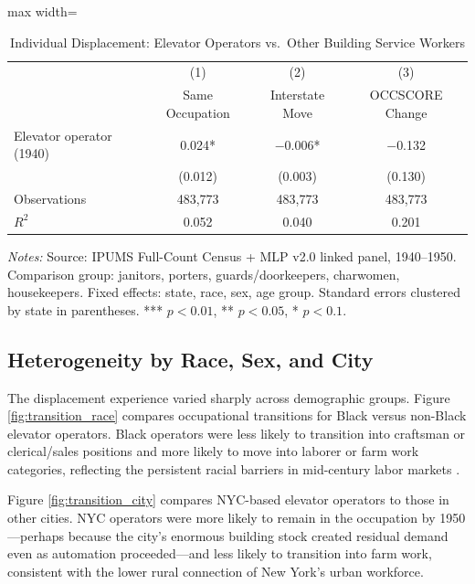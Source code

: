 \documentclass[12pt]{article}
\begin{document}
\begin{table}[H]
\centering
\caption{Individual Displacement: Elevator Operators vs.\ Other Building Service Workers}
\label{tab:displacement}
\begin{threeparttable}
\begin{adjustbox}{max width=\textwidth}
\begin{tabular}{lccc}
\toprule
& (1) & (2) & (3) \\
& Same Occupation & Interstate Move & OCCSCORE Change \\
\midrule
Elevator operator (1940) & 0.024* & $-$0.006* & $-$0.132 \\
& (0.012) & (0.003) & (0.130) \\
\midrule
Observations & 483,773 & 483,773 & 483,773 \\
$R^2$ & 0.052 & 0.040 & 0.201 \\
\bottomrule
\end{tabular}
\end{adjustbox}
\begin{tablenotes}[flushleft]
\small
\item \textit{Notes:} Source: IPUMS Full-Count Census + MLP v2.0 linked panel, 1940--1950. Comparison group: janitors, porters, guards/doorkeepers, charwomen, housekeepers. Fixed effects: state, race, sex, age group. Standard errors clustered by state in parentheses. *** $p<0.01$, ** $p<0.05$, * $p<0.1$.
\end{tablenotes}
\end{threeparttable}
\end{table}

\subsection{Heterogeneity by Race, Sex, and City}

The displacement experience varied sharply across demographic groups. Figure \ref{fig:transition_race} compares occupational transitions for Black versus non-Black elevator operators. Black operators were less likely to transition into craftsman or clerical/sales positions and more likely to move into laborer or farm work categories, reflecting the persistent racial barriers in mid-century labor markets \citep{collins2022}.

Figure \ref{fig:transition_city} compares NYC-based elevator operators to those in other cities. NYC operators were more likely to remain in the occupation by 1950---perhaps because the city's enormous building stock created residual demand even as automation proceeded---and less likely to transition into farm work, consistent with the lower rural connection of New York's urban workforce.
\end{document}
